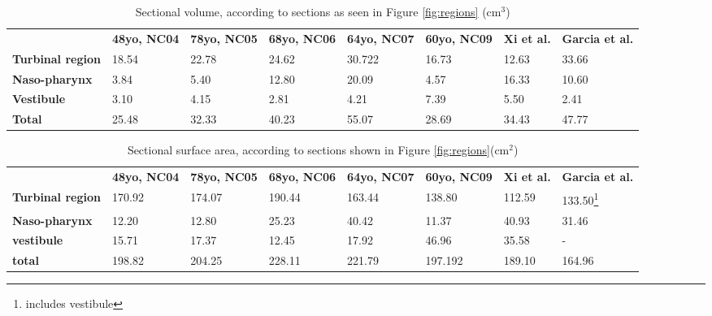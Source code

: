 \begin{table}
  \begin{tabular}{p{}p{}p{}p{}p{}p{}p{}p{}}
 & \textbf{48yo, NC04} & \textbf{78yo, NC05} & \textbf{68yo, NC06} & \textbf{64yo, NC07} & \textbf{60yo, NC09} &\textbf{Xi et al. \cite{Xi2012}} & \textbf{Garcia et al.\cite{Garcia2007}} \\
\cline{2-8}
\textbf{Turbinal region} & 18.54 & 22.78 & 24.62 & 30.722 & 16.73 & 12.63 & 33.66\\
\textbf{Naso-pharynx}  & 3.84 & 5.40 & 12.80 & 20.09 & 4.57 & 16.33 & 10.60\\
\textbf{Vestibule} & 3.10 & 4.15 & 2.81 & 4.21 & 7.39 & 5.50 & 2.41\\
\textbf{Total} & 25.48 & 32.33 & 40.23 & 55.07 & 28.69 & 34.43 & 47.77 \\
\hline
\end{tabular}
\caption{ Sectional volume, according to sections as seen in Figure \ref{fig:regions} ($\mathrm{cm^3}$)}\label{tab:secvol}
\end{table}
\begin{table}
  \begin{tabular}{p{}p{}p{}p{}p{}p{}p{}p{}}
 & \textbf{48yo, NC04} & \textbf{78yo, NC05} & \textbf{68yo, NC06} & \textbf{64yo, NC07} &\textbf{60yo, NC09}& \textbf{Xi et al.} & \textbf{Garcia et al.}\\
 \cline{2-8}
\textbf{Turbinal region} & 170.92 & 174.07& 190.44 & 163.44 & 138.80 & 112.59 & 133.50\footnote{includes vestibule} \\
\textbf{Naso-pharynx} & 12.20 & 12.80 & 25.23 & 40.42 & 11.37 & 40.93 & 31.46\\
\textbf{vestibule} & 15.71 & 17.37 & 12.45 & 17.92 & 46.96 & 35.58 &  -\\
\textbf{total} & 198.82 & 204.25 & 228.11 & 221.79 & 197.192 & 189.10 & 164.96\\
\hline
\end{tabular}
\caption{Sectional surface area, according to sections shown in Figure \ref{fig:regions}($\mathrm{cm^2}$)}\label{tab:secsa}
\end{table}
